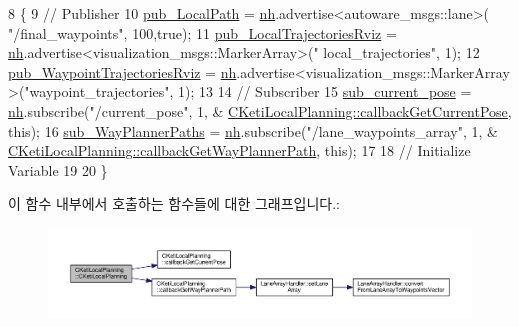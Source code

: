 \begin{DoxyCode}
8 \{
9   \textcolor{comment}{// Publisher}
10   \hyperlink{class_c_keti_local_planning_a42f394ae6069296e6f412eb5daa9dd3a}{pub\_LocalPath} = \hyperlink{class_c_keti_local_planning_a39a260e89fa7805f6c0c7112c91cb847}{nh}.advertise<autoware\_msgs::lane>( \textcolor{stringliteral}{"/final\_waypoints"}, 100,\textcolor{keyword}{true});
11   \hyperlink{class_c_keti_local_planning_a423ed1137dde91f12793bdcacb4e0bea}{pub\_LocalTrajectoriesRviz} = \hyperlink{class_c_keti_local_planning_a39a260e89fa7805f6c0c7112c91cb847}{nh}.advertise<visualization\_msgs::MarkerArray>(\textcolor{stringliteral}{"
      local\_trajectories"}, 1);
12   \hyperlink{class_c_keti_local_planning_a54aec2f11f157100a74b09a9cf5fa38b}{pub\_WaypointTrajectoriesRviz} = \hyperlink{class_c_keti_local_planning_a39a260e89fa7805f6c0c7112c91cb847}{nh}.advertise<visualization\_msgs::MarkerArray
      >(\textcolor{stringliteral}{"waypoint\_trajectories"}, 1);
13 
14   \textcolor{comment}{// Subscriber}
15   \hyperlink{class_c_keti_local_planning_ac399c600a59f7b79448ba1f1bbfda8ca}{sub\_current\_pose}  = \hyperlink{class_c_keti_local_planning_a39a260e89fa7805f6c0c7112c91cb847}{nh}.subscribe(\textcolor{stringliteral}{"/current\_pose"},           1,      &
      \hyperlink{class_c_keti_local_planning_a144131de19f37584bab4412f98e1fc63}{CKetiLocalPlanning::callbackGetCurrentPose},       \textcolor{keyword}{this});
16   \hyperlink{class_c_keti_local_planning_a75e59488889af86a89995f2c606677ce}{sub\_WayPlannerPaths} = \hyperlink{class_c_keti_local_planning_a39a260e89fa7805f6c0c7112c91cb847}{nh}.subscribe(\textcolor{stringliteral}{"/lane\_waypoints\_array"},  1,      &
      \hyperlink{class_c_keti_local_planning_ab385a1021d3d90f9f2b7b5a40dd791c2}{CKetiLocalPlanning::callbackGetWayPlannerPath},     \textcolor{keyword}{this});
17 
18   \textcolor{comment}{// Initialize Variable}
19 
20 \}
\end{DoxyCode}


이 함수 내부에서 호출하는 함수들에 대한 그래프입니다.\+:\nopagebreak
\begin{figure}[H]
\begin{center}
\leavevmode
\includegraphics[width=350pt]{class_c_keti_local_planning_a64e789f070f7334aab7727c0ae276931_cgraph}
\end{center}
\end{figure}


